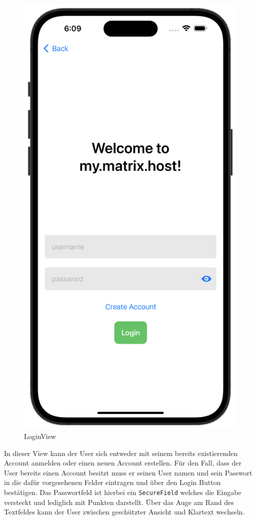     \begin{figure}[h]
        \includegraphics[scale=0.5]{login_white}
        \centering
        \caption{LoginView}\label{fig:loginview}
    \end{figure}
    In dieser View kann der User sich entweder mit seinem bereits existierenden Account anmelden oder einen neuen Account erstellen.
    Für den Fall, dass der User bereits einen Account besitzt muss er seinen User namen und sein Passwort in die dafür vorgesehenen Felder eintragen und über den Login Button bestätigen.
    Das Passwortfeld ist hierbei ein \texttt{SecureField} welches die Eingabe versteckt und lediglich mit Punkten darstellt.
    Über das Auge am Rand des Textfeldes kann der User zwischen geschützter Ansicht und Klartext wechseln.


